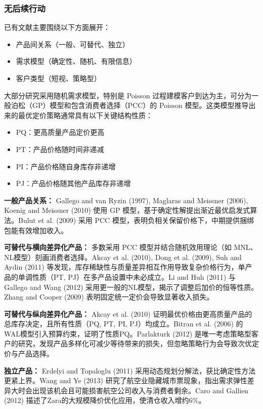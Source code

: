 \subsubsection{无后续行动}\label{without-follow-up}

已有文献主要围绕以下方面展开：
\begin{itemize}
	\item 产品间关系（一般、可替代、独立）
	\item 需求模型（确定性、随机、有限信息）
	\item 客户类型（短视、策略型）
\end{itemize}


大部分研究采用随机需求模型，特别是 Poisson 过程建模客户到达为主，可分为一般泊松（GP）模型和包含消费者选择（PCC）的 Poisson 模型。这类模型推导出来的最优定价策略通常具有以下关键结构性质：
\begin{itemize}
	\item PQ：更高质量产品定价更高
	\item PT：产品价格随时间非递减
	\item PI：产品价格随自身库存非递增
	\item PJ：产品价格随其他产品库存非递增
\end{itemize}

\textbf{一般产品关系：} Gallego and van Ryzin (1997), Maglaras and Meissner (2006), Koenig and Meissner (2010) 使用 GP 模型，基于确定性解提出渐近最优启发式算法。Bulut et al. (2009) 采用 PCC 模型，表明负相关保留价格下，中期提供捆绑包能有效增加收入。

\textbf{可替代与横向差异化产品：} 多数采用 PCC 模型并结合随机效用理论（如 MNL、NL模型）刻画消费者选择。Akcay et al. (2010), Dong et al. (2009), Suh and Aydin (2011) 等发现，库存稀缺性与质量差异相互作用导致复杂价格行为，单产品的单调性质（PT, PJ）在多产品设置中未必成立。Li and Huh (2011) 与 Gallego and Wang (2012) 采用更一般的NL模型，揭示了调整后加价的恒等性质。Zhang and Cooper (2009) 表明固定统一定价会导致显著收入损失。

\textbf{可替代与纵向差异化产品：} Akcay et al. (2010) 证明最优价格由更高质量产品的总库存决定，且所有性质（PQ, PT, PI, PJ）均成立。Bitran et al. (2006) 的WAL模型引入预算约束，证明了性质PQ。Parlakturk (2012) 是唯一考虑策略型客户的研究，发现产品多样化可减少等待带来的损失，但忽略策略行为会导致次优定价与产品选择。

\textbf{独立产品：} Erdelyi and Topaloglu (2011) 采用动态规划分解法，获比确定性方法更紧上界。Wang and Ye (2013) 研究了航空业隐藏城市票现象，指出需求弹性差异大时会出现该机会且可能损害航空公司收入与消费者剩余。Caro and Gallien (2012) 描述了Zara的大规模降价优化应用，使清仓收入增约6\%。

